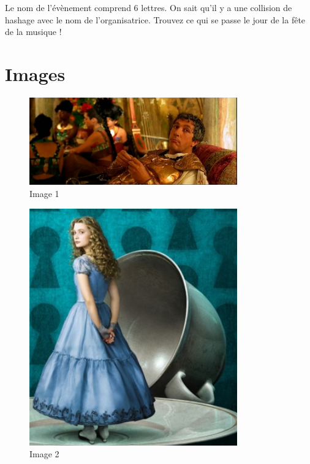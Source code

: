 \documentclass{article}
\begin{document}
	Le nom de l’évènement comprend 6 lettres. On sait qu’il y a une collision de hashage avec le nom de l’organisatrice. Trouvez ce qui se passe le jour de la fête de la musique !
	
	\section*{Images}
	
	\begin{figure}[H]
		\centering
		\includegraphics[width=0.8\textwidth]{image1.png}
		\caption{Image 1}
	\end{figure}
	
	\begin{figure}[H]
		\centering
		\includegraphics[width=0.8\textwidth]{image2.png}
		\caption{Image 2}
	\end{figure}
	
\end{document}
